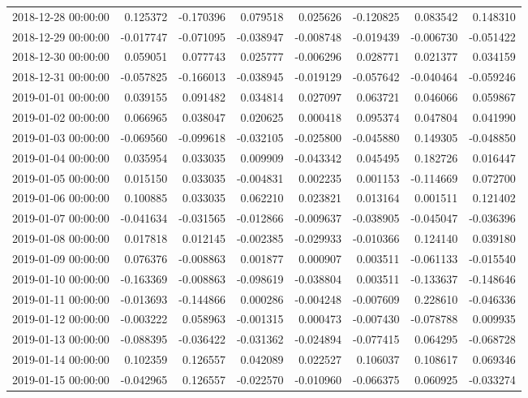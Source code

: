 \begin{tabular}{lrrrrrrr}
2018-12-28 00:00:00 & 0.125372 & -0.170396 & 0.079518 & 0.025626 & -0.120825 & 0.083542 & 0.148310 \\
2018-12-29 00:00:00 & -0.017747 & -0.071095 & -0.038947 & -0.008748 & -0.019439 & -0.006730 & -0.051422 \\
2018-12-30 00:00:00 & 0.059051 & 0.077743 & 0.025777 & -0.006296 & 0.028771 & 0.021377 & 0.034159 \\
2018-12-31 00:00:00 & -0.057825 & -0.166013 & -0.038945 & -0.019129 & -0.057642 & -0.040464 & -0.059246 \\
2019-01-01 00:00:00 & 0.039155 & 0.091482 & 0.034814 & 0.027097 & 0.063721 & 0.046066 & 0.059867 \\
2019-01-02 00:00:00 & 0.066965 & 0.038047 & 0.020625 & 0.000418 & 0.095374 & 0.047804 & 0.041990 \\
2019-01-03 00:00:00 & -0.069560 & -0.099618 & -0.032105 & -0.025800 & -0.045880 & 0.149305 & -0.048850 \\
2019-01-04 00:00:00 & 0.035954 & 0.033035 & 0.009909 & -0.043342 & 0.045495 & 0.182726 & 0.016447 \\
2019-01-05 00:00:00 & 0.015150 & 0.033035 & -0.004831 & 0.002235 & 0.001153 & -0.114669 & 0.072700 \\
2019-01-06 00:00:00 & 0.100885 & 0.033035 & 0.062210 & 0.023821 & 0.013164 & 0.001511 & 0.121402 \\
2019-01-07 00:00:00 & -0.041634 & -0.031565 & -0.012866 & -0.009637 & -0.038905 & -0.045047 & -0.036396 \\
2019-01-08 00:00:00 & 0.017818 & 0.012145 & -0.002385 & -0.029933 & -0.010366 & 0.124140 & 0.039180 \\
2019-01-09 00:00:00 & 0.076376 & -0.008863 & 0.001877 & 0.000907 & 0.003511 & -0.061133 & -0.015540 \\
2019-01-10 00:00:00 & -0.163369 & -0.008863 & -0.098619 & -0.038804 & 0.003511 & -0.133637 & -0.148646 \\
2019-01-11 00:00:00 & -0.013693 & -0.144866 & 0.000286 & -0.004248 & -0.007609 & 0.228610 & -0.046336 \\
2019-01-12 00:00:00 & -0.003222 & 0.058963 & -0.001315 & 0.000473 & -0.007430 & -0.078788 & 0.009935 \\
2019-01-13 00:00:00 & -0.088395 & -0.036422 & -0.031362 & -0.024894 & -0.077415 & 0.064295 & -0.068728 \\
2019-01-14 00:00:00 & 0.102359 & 0.126557 & 0.042089 & 0.022527 & 0.106037 & 0.108617 & 0.069346 \\
2019-01-15 00:00:00 & -0.042965 & 0.126557 & -0.022570 & -0.010960 & -0.066375 & 0.060925 & -0.033274 \\

\end{tabular}
